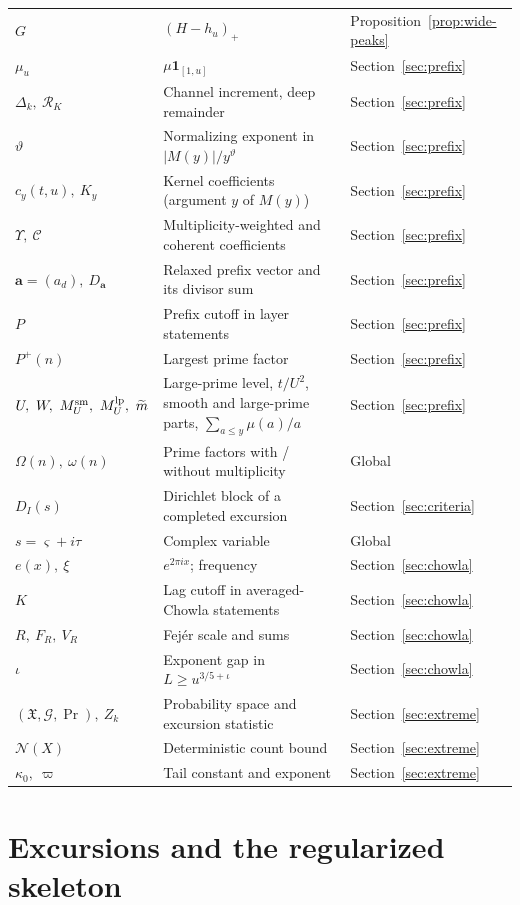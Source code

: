 \documentclass[11pt,reqno]{amsart}
\numberwithin{equation}{section}
\theoremstyle{plain}
\theoremstyle{definition}
\theoremstyle{remark}
\newcommand{\Pp}{P^{+}}
\newcommand{\Cc}{\mathcal{C}}
\newcommand{\mt}{\widetilde{m}}
\begin{document}
\begin{longtable}{@{}p{}p{}p{}@{}}
$G$ & $(H-h_u)_+$ & Proposition~\ref{prop:wide-peaks}\\
$\mu_u$ & $\mu\mathbf 1_{[1,u]}$ & Section~\ref{sec:prefix}\\
$\Delta_k,\ \mathcal R_K$ & Channel increment, deep remainder & Section~\ref{sec:prefix}\\
$\vartheta$ & Normalizing exponent in $|M(y)|/y^\vartheta$ & Section~\ref{sec:prefix}\\
$c_y(t,u),\ K_y$ & Kernel coefficients (argument $y$ of $M(y)$) & Section~\ref{sec:prefix}\\
$\Upsilon,\ \Cc$ & Multiplicity-weighted and coherent coefficients & Section~\ref{sec:prefix}\\
$\mathbf a=(a_d),\ D_{\mathbf a}$ & Relaxed prefix vector and its divisor sum & Section~\ref{sec:prefix}\\
$P$ & Prefix cutoff in layer statements & Section~\ref{sec:prefix}\\
$\Pp(n)$ & Largest prime factor & Section~\ref{sec:prefix}\\
$U,\ W,\ M^{\rm sm}_U,\ M^{\rm lp}_U,\ \mt$ & Large-prime level, $t/U^2$, smooth and large-prime parts, $\sum_{a\le y}\mu(a)/a$ & Section~\ref{sec:prefix}\\
$\Omega(n),\ \omega(n)$ & Prime factors with / without multiplicity & Global\\
$D_I(s)$ & Dirichlet block of a completed excursion & Section~\ref{sec:criteria}\\
$s=\varsigma+i\tau$ & Complex variable & Global\\
$e(x),\ \xi$ & $e^{2\pi ix}$; frequency & Section~\ref{sec:chowla}\\
$K$ & Lag cutoff in averaged-Chowla statements & Section~\ref{sec:chowla}\\
$R,\ F_R,\ V_R$ & Fejér scale and sums & Section~\ref{sec:chowla}\\
$\iota$ & Exponent gap in $L\ge u^{3/5+\iota}$ & Section~\ref{sec:chowla}\\
$(\mathfrak X,\mathcal G,\Pr),\ Z_k$ & Probability space and excursion statistic & Section~\ref{sec:extreme}\\
$\mathcal N(X)$ & Deterministic count bound & Section~\ref{sec:extreme}\\
$\kappa_0,\ \varpi$ & Tail constant and exponent & Section~\ref{sec:extreme}\\
\bottomrule
\end{longtable}
\normalsize

\section{Excursions and the regularized skeleton}
\label{sec:definitions}
\end{document}
